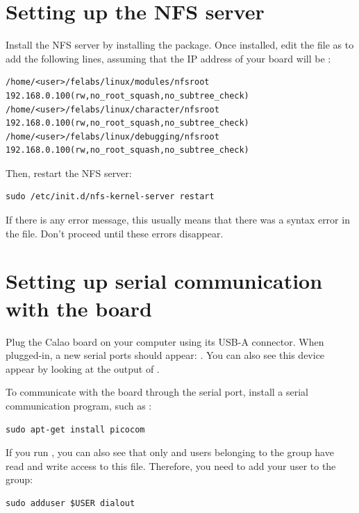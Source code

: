 \section{Setting up the NFS server}

Install the NFS server by installing the 
package. Once installed, edit the  file as
 to add the following lines, assuming that the IP address
of your board will be :

\scriptsize
\begin{verbatim}
/home/<user>/felabs/linux/modules/nfsroot 192.168.0.100(rw,no_root_squash,no_subtree_check)
/home/<user>/felabs/linux/character/nfsroot 192.168.0.100(rw,no_root_squash,no_subtree_check)
/home/<user>/felabs/linux/debugging/nfsroot 192.168.0.100(rw,no_root_squash,no_subtree_check)
\end{verbatim}
\normalsize

Then, restart the NFS server:

\begin{verbatim}
sudo /etc/init.d/nfs-kernel-server restart
\end{verbatim}

If there is any error message, this usually means that there was a
syntax error in the  file. Don't proceed until these
errors disappear.

\section{Setting up serial communication with the board}

Plug the Calao board on your computer using its USB-A connector. When
plugged-in, a new serial ports should appear: .
You can also see this device appear by looking at the output of .

To communicate with the board through the serial port, install a serial communication program, such as :

\begin{verbatim}
sudo apt-get install picocom
\end{verbatim}

If you run , you can also see that only
 and users belonging to the  group have
read and write access to this file. Therefore, you need to add your user
to the  group:

\begin{verbatim}
sudo adduser $USER dialout
\end{verbatim}

